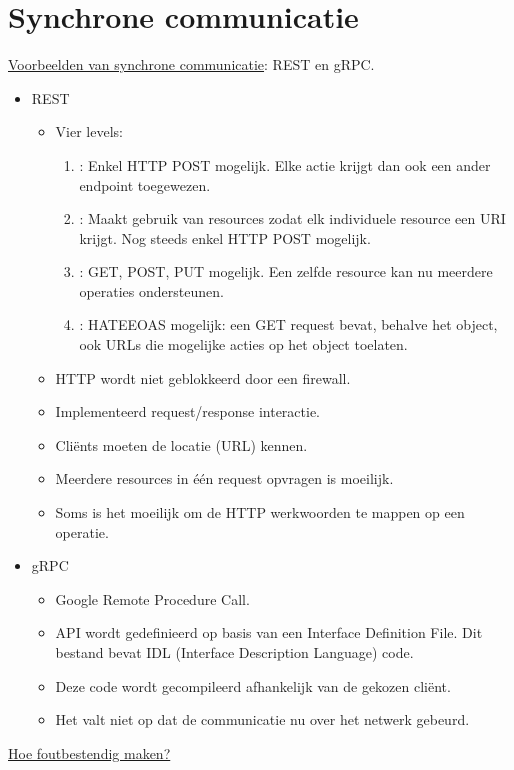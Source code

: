 \documentclass{report}
\begin{document}
	\section{Synchrone communicatie}
	\underline{Voorbeelden van synchrone communicatie}: REST en gRPC.
	\begin{itemize}
		\item[\info] REST
		\begin{itemize}
			\item[\info] Vier levels:
			\begin{enumerate}
				\item[0]: Enkel HTTP POST mogelijk. Elke actie krijgt dan ook een ander endpoint toegewezen.
				\item[1]: Maakt gebruik van resources zodat elk individuele resource een URI krijgt. Nog steeds enkel HTTP POST mogelijk.
				\item[2]: GET, POST, PUT mogelijk. Een zelfde resource kan nu meerdere operaties ondersteunen.
				\item[3]: HATEEOAS mogelijk: een GET request bevat, behalve het object, ook URLs die mogelijke acties op het object toelaten.
			\end{enumerate}
			\item[\good] HTTP wordt niet geblokkeerd door een firewall.
			\item[\good] Implementeerd request/response interactie.
			\item[\alert] Cliënts moeten de locatie (URL) kennen.
			\item[\alert] Meerdere resources in één request opvragen is moeilijk. 
			\item[\alert] Soms is het moeilijk om de HTTP werkwoorden te mappen op een operatie.
		\end{itemize}
		\item[\info] gRPC
		\begin{itemize}
			\item[\info] Google Remote Procedure Call.
			\item[\info] API wordt gedefinieerd op basis van een Interface Definition File. Dit bestand bevat IDL (Interface Description Language) code.
			\item[\info] Deze code wordt gecompileerd afhankelijk van de gekozen cliënt.
			\item[\alert] Het valt niet op dat de communicatie nu over het netwerk gebeurd.
		\end{itemize}
	\end{itemize}
	\underline{Hoe foutbestendig maken?}
\end{document}
